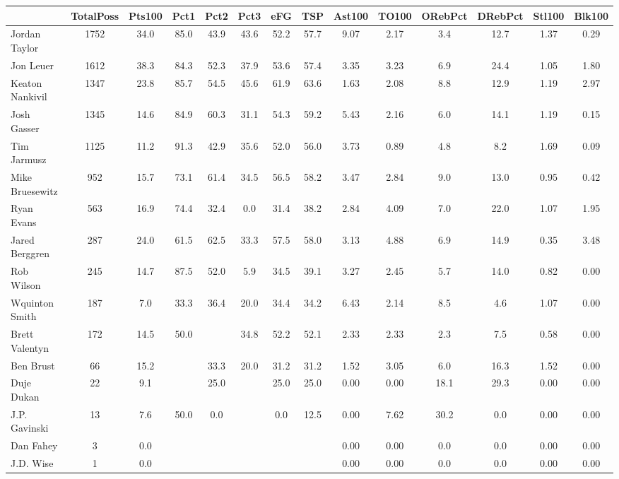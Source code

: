 \documentclass[10pt,letterpaper]{article}
\begin{document}
\begin{table}[ht]
\begin{center}
\begin{tabular}{lccccccccccccc}
  \hline
 & TotalPoss & Pts100 & Pct1 & Pct2 & Pct3 & eFG & TSP & Ast100 & TO100 & ORebPct & DRebPct & Stl100 & Blk100 \\ 
  \hline
Jordan Taylor & 1752 & 34.0 & 85.0 & 43.9 & 43.6 & 52.2 & 57.7 & 9.07 & 2.17 & 3.4 & 12.7 & 1.37 & 0.29 \\ 
  Jon Leuer & 1612 & 38.3 & 84.3 & 52.3 & 37.9 & 53.6 & 57.4 & 3.35 & 3.23 & 6.9 & 24.4 & 1.05 & 1.80 \\ 
  Keaton Nankivil & 1347 & 23.8 & 85.7 & 54.5 & 45.6 & 61.9 & 63.6 & 1.63 & 2.08 & 8.8 & 12.9 & 1.19 & 2.97 \\ 
  Josh Gasser & 1345 & 14.6 & 84.9 & 60.3 & 31.1 & 54.3 & 59.2 & 5.43 & 2.16 & 6.0 & 14.1 & 1.19 & 0.15 \\ 
  Tim Jarmusz & 1125 & 11.2 & 91.3 & 42.9 & 35.6 & 52.0 & 56.0 & 3.73 & 0.89 & 4.8 & 8.2 & 1.69 & 0.09 \\ 
  Mike Bruesewitz & 952 & 15.7 & 73.1 & 61.4 & 34.5 & 56.5 & 58.2 & 3.47 & 2.84 & 9.0 & 13.0 & 0.95 & 0.42 \\ 
  Ryan Evans & 563 & 16.9 & 74.4 & 32.4 & 0.0 & 31.4 & 38.2 & 2.84 & 4.09 & 7.0 & 22.0 & 1.07 & 1.95 \\ 
  Jared Berggren & 287 & 24.0 & 61.5 & 62.5 & 33.3 & 57.5 & 58.0 & 3.13 & 4.88 & 6.9 & 14.9 & 0.35 & 3.48 \\ 
  Rob Wilson & 245 & 14.7 & 87.5 & 52.0 & 5.9 & 34.5 & 39.1 & 3.27 & 2.45 & 5.7 & 14.0 & 0.82 & 0.00 \\ 
  Wquinton Smith & 187 & 7.0 & 33.3 & 36.4 & 20.0 & 34.4 & 34.2 & 6.43 & 2.14 & 8.5 & 4.6 & 1.07 & 0.00 \\ 
  Brett Valentyn & 172 & 14.5 & 50.0 &  & 34.8 & 52.2 & 52.1 & 2.33 & 2.33 & 2.3 & 7.5 & 0.58 & 0.00 \\ 
  Ben Brust & 66 & 15.2 &  & 33.3 & 20.0 & 31.2 & 31.2 & 1.52 & 3.05 & 6.0 & 16.3 & 1.52 & 0.00 \\ 
  Duje Dukan & 22 & 9.1 &  & 25.0 &  & 25.0 & 25.0 & 0.00 & 0.00 & 18.1 & 29.3 & 0.00 & 0.00 \\ 
  J.P. Gavinski & 13 & 7.6 & 50.0 & 0.0 &  & 0.0 & 12.5 & 0.00 & 7.62 & 30.2 & 0.0 & 0.00 & 0.00 \\ 
  Dan Fahey & 3 & 0.0 &  &  &  &  &  & 0.00 & 0.00 & 0.0 & 0.0 & 0.00 & 0.00 \\ 
  J.D. Wise & 1 & 0.0 &  &  &  &  &  & 0.00 & 0.00 & 0.0 & 0.0 & 0.00 & 0.00 \\ 
   \hline
\end{tabular}
\end{center}
\end{table}
\end{document}
